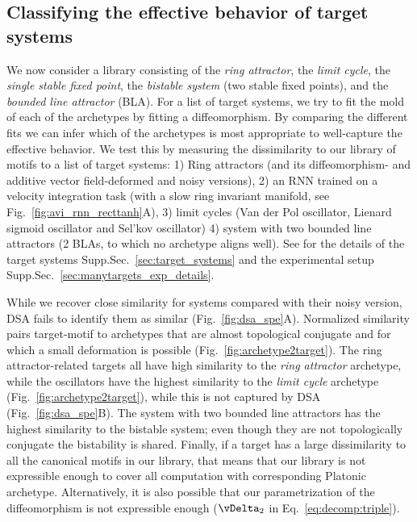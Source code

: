 \documentclass{article}
\theoremstyle{definition} \newtheorem{definition}{Definition}  \newtheorem{example}{Example}
\theoremstyle{remark} \newtheorem{remark}{Remark}
\newcounter{ct}
\begin{document}
\subsection{Classifying the effective behavior of target systems}\label{sec:target_demonstrations}
We now consider a library consisting of the \emph{ring attractor}, the \emph{limit cycle}, the \emph{single stable fixed point}, the \emph{bistable system} (two stable fixed points), and the \emph{bounded line attractor} (BLA).
For a list of target systems, we try to fit the mold of each of the archetypes by fitting a diffeomorphism.
By comparing the different fits we can infer which of the archetypes is most appropriate to well-capture the effective behavior.
We test this by measuring the dissimilarity to our library of motifs to a list of target systems:
1) Ring attractors (and its diffeomorphism- and additive vector field-deformed and noisy versions),
2) an RNN trained on a velocity integration task (with a slow ring invariant manifold, see Fig.~\ref{fig:avi_rnn_recttanh}A),
3) limit cycles (Van der Pol oscillator, Lienard sigmoid oscillator and Sel'kov oscillator)
4) system with two bounded line attractors (2 BLAs, to which no archetype aligns well).
See for the details of the target systems Supp.Sec.~\ref{sec:target_systems} and the experimental setup Supp.Sec.~\ref{sec:manytargets_exp_details}.


While we recover close similarity for systems compared with their noisy version, DSA fails to identify them as similar (Fig.~\ref{fig:dsa_spe}A).
Normalized similarity pairs target-motif to archetypes that are almost topological conjugate and for which a small deformation is possible (Fig.~\ref{fig:archetype2target}). 
The ring attractor-related targets all have high similarity to the \emph{ring attractor} archetype, while the oscillators have the highest similarity to the \emph{limit cycle} archetype (Fig.~\ref{fig:archetype2target}), while this is not captured by DSA (Fig.~\ref{fig:dsa_spe}B). 
The system with two bounded line attractors has the highest similarity to the bistable system; even though they are not topologically conjugate the bistability is shared.
Finally, if a target has a large dissimilarity to all the canonical motifs in our library, that means that our library is not expressible enough to cover all computation with corresponding Platonic archetype.
Alternatively, it is also possible that our parametrization of the diffeomorphism is not expressible enough ($\vDelta_2$ in Eq.~\ref{eq:decomp:triple}).
\end{document}
